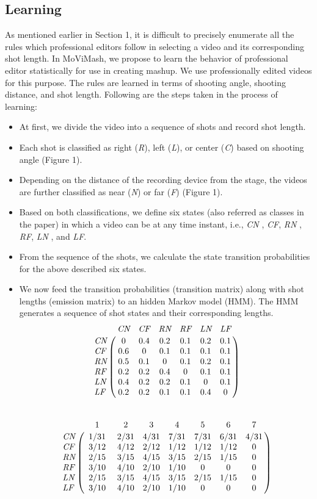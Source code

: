 \documentclass{new}
\begin{document}
\subsection{ Learning}
As mentioned earlier in Section 1, it is difficult to precisely enumerate all the rules which professional editors follow in selecting
a video and its corresponding shot length. In MoViMash, we propose
to learn the behavior of professional editor statistically for use
in creating mashup. We use professionally edited videos for this
purpose. The rules are learned in terms of shooting angle, shooting
distance, and shot length. Following are the steps taken in the
process of learning:
\begin{itemize}
    \item At first, we divide the video into a sequence of shots and
record shot length.
    \item Each shot is classified as right (\textit{R}), left (\textit{L}), or center (\textit{C}) based on shooting angle (Figure 1).
    \item Depending on the distance of the recording device from the
stage, the videos are further classified as near (\textit{N}) or far (\textit{F}) (Figure 1).
    \item Based on both classifications, we define six states (also referred as classes in the paper) in which a video can be at any
time instant, i.e., \textit{CN} , \textit{CF}, \textit{RN} , \textit{RF}, \textit{LN} , and \textit{LF}.
    \item From the sequence of the shots, we calculate the state transition probabilities for the above described six states.
   \item We now feed the transition probabilities (transition matrix)
along with shot lengths (emission matrix) to an hidden Markov
model (HMM). The HMM generates a sequence of shot states
and their corresponding lengths.\\
\begin{equation}
\bordermatrix{\text{} & \textit{CN} & \textit{CF} & \textit{RN} & \textit{RF} &  \textit{LN} & \textit{LF}\cr
\textit{CN} & 0 & 0.4 & 0.2 & 0.1 & 0.2 & 0.1\cr
\textit{CF} & 0.6 & 0 & 0.1 & 0.1 & 0.1 & 0.1\cr
\textit{RN} & 0.5 & 0.1 & 0 & 0.1 & 0.2 & 0.1\cr
\textit{RF} & 0.2 & 0.2 & 0.4 & 0 & 0.1 & 0.1\cr
\textit{LN} & 0.4 & 0.2 & 0.2 & 0.1 & 0 & 0.1\cr
\textit{LF} & 0.2 & 0.2 & 0.1 & 0.1 & 0.4 & 0
}
\end{equation}\\

\begin{equation}
\bordermatrix{\text{} & 1 & 2 & 3 & 4 & 5 & 6 & 7\cr
\textit{CN} & $ 1/31 $ & $2/31$ & $4/31$ & $7/31$ & $7/31$ & $6/31$ & $4/31$\cr
\textit{CF} & $3/12$ & $4/12$ & $2/12$ & $1/12$ & $1/12$ &$1/12$ & 0\cr
\textit{RN} & $2/15$ & $3/15$ & $4/15$ & $3/15$ & $2/15$ & 1/15 & 0\cr
\textit{RF} & 3/10 & 4/10 & 2/10 & 1/10 & 0 & 0 & 0\cr
\textit{LN} & $2/15$ & $3/15$ & $4/15$ & $3/15$ & $2/15$ & 1/15 & 0\cr
\textit{LF} & 3/10 & 4/10 & 2/10 & 1/10 & 0 & 0 & 0\cr
}
\end{equation}\\
\end{itemize}
\end{document}
